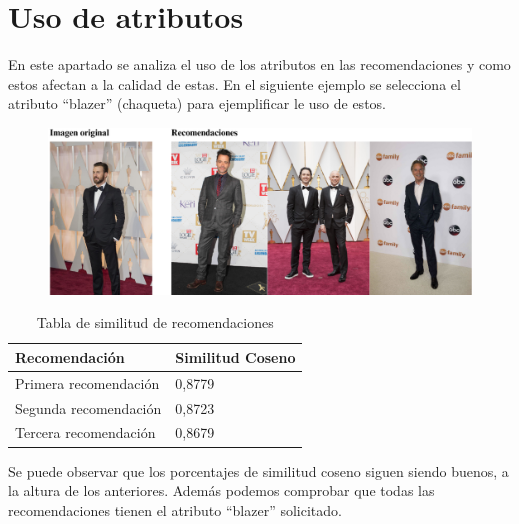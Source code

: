 \documentclass[12pt]{report} %
\begin{document}
	\section{Uso de atributos}

	En este apartado se analiza el uso de los atributos en las recomendaciones y como estos afectan a la calidad
	de estas. En el siguiente ejemplo se selecciona el atributo ``blazer'' (chaqueta) para ejemplificar le uso de estos.
	\begin{figure}[H]
		{\includegraphics[scale=0.6]{atributos1.png}}
	\end{figure}
	\begin{table}[H]
		\centering
		\caption{Tabla de similitud de recomendaciones}
		\begin{tabular}{ll}
				\textbf{Recomendación} & \textbf{Similitud Coseno} \\
				\midrule
				Primera recomendación & 0,8779 \\
				Segunda recomendación & 0,8723 \\
				Tercera recomendación & 0,8679 \\
				\bottomrule
		\end{tabular}
	\end{table}
	
	Se puede observar que los porcentajes de similitud coseno siguen siendo buenos, a la altura de los anteriores. Además 
	podemos comprobar que todas las recomendaciones tienen el atributo ``blazer'' solicitado. 
	
\end{document}
